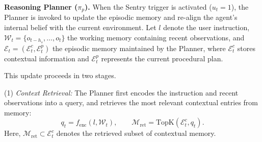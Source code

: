 


\textbf{Reasoning Planner ($\pi_p$).}
When the Sentry trigger is activated ($u_t = 1$), the Planner is invoked to update the episodic memory and re-align the agent's internal belief with the current environment. Let $l$ denote the user instruction, $\mathcal{W}_t = \{o_{t-h_s}, \dots, o_t\}$ the working memory containing recent observations, and $\mathcal{E}_t = (\mathcal{E}_t^c, \mathcal{E}_t^p)$ the episodic memory maintained by the Planner, where $\mathcal{E}_t^c$ stores contextual information and $\mathcal{E}_t^p$ represents the current procedural plan.

This update proceeds in two stages.

(1) \textit{Context Retrieval:}
The Planner first encodes the instruction and recent observations into a query, and retrieves the most relevant contextual entries from memory:
\begin{equation}
    q_t = f_{\text{enc}}(l, \mathcal{W}_t), \qquad
    \mathcal{M}_{\mathrm{ret}} = \mathrm{TopK}(\mathcal{E}_t^c, q_t).
\end{equation}
Here, $\mathcal{M}_{\mathrm{ret}} \subset \mathcal{E}_t^c$ denotes the retrieved subset of contextual memory.

